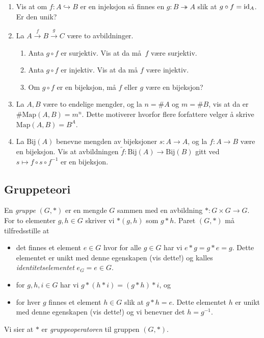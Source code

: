 \begin{enumerate}
    \item Vis at om $f\colon A\hookrightarrow B$ er en injeksjon
        så finnes en $g\colon B\twoheadrightarrow A$ slik at
        $g\circ f = \operatorname{id}_A$.
        Er den unik?
    \item La $A\xrightarrow{f} B\xrightarrow{g} C$ være to avbildninger.
        \begin{enumerate}
            \item
                Anta $g\circ f$ er surjektiv.
                Vis at da må $f$ være surjektiv.
            \item
                Anta $g\circ f$ er injektiv.
                Vis at da må $f$ være injektiv.
            \item
                Om $g\circ f$ er en bijeksjon, må $f$ eller $g$ være en bijeksjon?
        \end{enumerate}
    \item La $A, B$ være to endelige mengder, og la $n = \# A$ og $m=\# B$,
        vis at da er $\# \mathrm{Map}(A,B) = m^n$.
        Dette motiverer hvorfor flere forfattere velger å skrive
        $\mathrm{Map}(A,B) = B^A$.
    \item La $\mathrm{Bij}(A)$ benevne mengden av bijeksjoner $s\colon A\to A$,
        og la $f\colon A\to B$ være en bijeksjon.
        Vis at avbildningen $\tilde f\colon \mathrm{Bij}(A)\to \mathrm{Bij}(B)$
        gitt ved $s\mapsto f\circ s\circ f^{-1}$ er en bijeksjon.
\end{enumerate}

\subsection{Gruppeteori}

\begin{definition}
    En \textit{gruppe} $(G,\ast)$ er en mengde $G$ sammen med en avbildning
    $\ast\colon G\times G\to G$.
    For to elementer $g, h\in G$ skriver vi $\ast(g,h)$ som $g\ast h$.
    Paret $(G, \ast)$ må tilfredsstille at
    \begin{itemize}
        \item det finnes et element $e\in G$ hvor for alle $g\in G$
            har vi $e\ast g = g\ast e = g$.
            Dette elementet er unikt med denne egenskapen (vis dette!)
            og kalles \textit{identitetselementet} $e_G = e \in G$.
        \item for $g, h, i\in G$ har vi
            $g\ast (h\ast i) = (g\ast h)\ast i$, og
        \item for hver $g$ finnes et element $h\in G$
            slik at $g \ast h = e$.
            Dette elementet $h$ er unikt med denne egenskapen (vis dette!)
            og vi benevner det $h = g^{-1}$.
    \end{itemize}
    Vi sier at $\ast$ er \textit{gruppeoperatoren} til gruppen $(G,\ast)$.
\end{definition}


